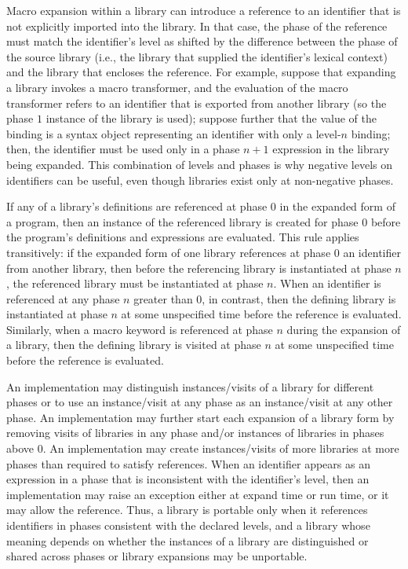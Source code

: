 Macro expansion within a library can introduce a reference to an
identifier that is not explicitly imported into the library. In that
case, the phase of the reference must match the identifier's level as
shifted by the difference between the phase of the source library
(i.e., the library that supplied the identifier's lexical context) and
the library that encloses the reference. For example, suppose that
expanding a library invokes a macro transformer, and the evaluation of
the macro transformer refers to an identifier that is exported from
another library (so the phase $1$ instance of the library is used);
suppose further that the value of the binding is a syntax object
representing an identifier with only a level-$n$ binding; then, the
identifier must be used only in a phase $n+1$ expression in the
library being expanded. This combination of levels and phases is why
negative levels on identifiers can be useful, even though libraries
exist only at non-negative phases.

If any of a library's definitions are referenced at phase $0$ in the
expanded form of a program, then an instance of the referenced library
is created for phase $0$ before the program's definitions and
expressions are evaluated. This rule applies transitively: if the
expanded form of one library references at phase $0$ an identifier
from another library, then before the referencing library is
instantiated at phase $n$, the referenced library must be instantiated
at phase $n$. When an identifier is referenced at any phase $n$
greater than $0$, in contrast, then the defining library is
instantiated at phase $n$ at some unspecified time before the
reference is evaluated. Similarly, when a macro keyword is referenced at
phase $n$ during the expansion of a library, then the
defining library is visited at phase $n$ at some unspecified time
before the reference is evaluated.

An implementation may distinguish instances/visits of a library for
different phases or to use an instance/visit at any phase as an instance/visit at
any other phase. An implementation may further start each
expansion of a {\cf library} form by removing
visits of libraries in any phase and/or instances of
libraries in phases above $0$. An implementation may
create instances/visits of more libraries at more phases than required to
satisfy references. When an identifier appears as an expression in a
phase that is inconsistent with the identifier's level, then an
implementation may raise an exception either at expand time or run
time, or it may allow the reference. Thus, a library is portable only
when it references identifiers in phases consistent with the declared
levels, and a library whose meaning depends on whether the
instances of a library are distinguished or shared across phases or
{\cf library} expansions may be unportable.

